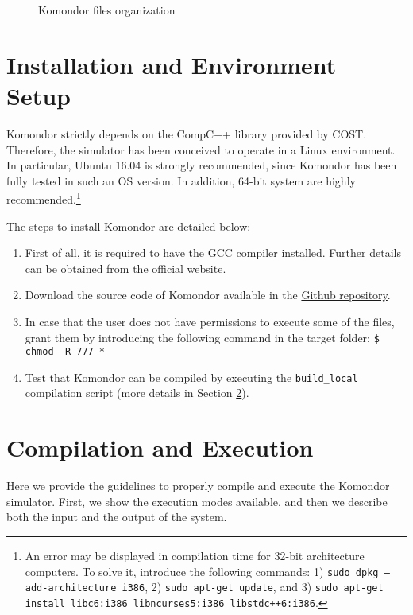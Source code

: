 \documentclass[a4paper]{article}
\begin{document}
	\begin{figure}[h!]
		\centering
		\caption{Komondor files organization}
		\label{fig:komondor_files}
	\end{figure}	

\section{Installation and Environment Setup}

Komondor strictly depends on the CompC++ library provided by COST. Therefore, the simulator has been conceived to operate in a Linux environment. In particular, Ubuntu 16.04 is strongly recommended, since Komondor has been fully tested in such an OS version. In addition, 64-bit system are highly recommended.\footnote{An error may be displayed in compilation time for 32-bit architecture computers. To solve it, introduce the following commands: 1) \texttt{sudo dpkg --add-architecture i386}, 2) \texttt{sudo apt-get update}, and 3) \texttt{sudo apt-get install libc6:i386 libncurses5:i386 libstdc++6:i386}.}

The steps to install Komondor are detailed below:
\begin{enumerate}
	\item First of all, it is required to have the GCC compiler installed. Further details can be obtained from the official \href{http://gcc.gnu.org/install/}{website}.
	\item Download the source code of Komondor available in the \href{https://github.com/wn-upf/Komondor/tree/master/Code}{Github repository}.
	\item In case that the user does not have permissions to execute some of the files, grant them by introducing the following command in the target folder: \texttt{\$ chmod -R 777 *}
	\item Test that Komondor can be compiled by executing the \texttt{build\_local} compilation script (more details in Section \ref{section:execution}).
 \end{enumerate}

\section{Compilation and Execution}
\label{section:execution}
Here we provide the guidelines to properly compile and execute the Komondor simulator. First, we show the execution modes available, and then we describe both the input and the output of the system.
\end{document}
